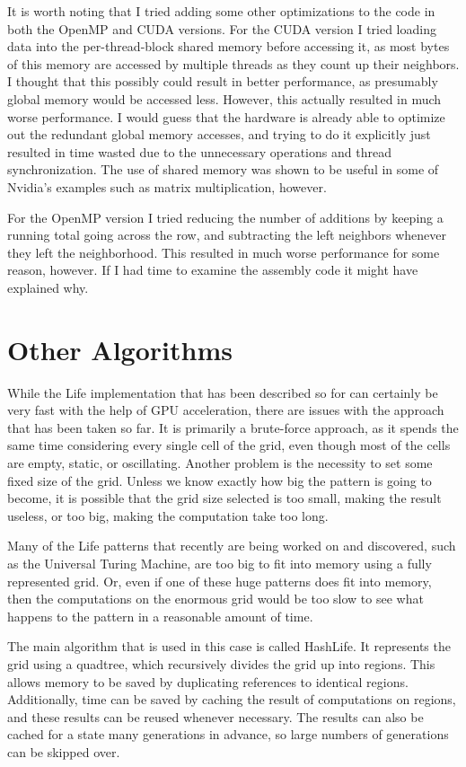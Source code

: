 \documentclass[letterpaper,12pt]{article}
\begin{document}
It is worth noting that I tried adding some other optimizations to the code in
both the OpenMP and CUDA versions.  For the CUDA version I tried loading data
into the per-thread-block shared memory before accessing it, as most bytes of
this memory are accessed by multiple threads as they count up their neighbors.
I thought that this possibly could result in better performance, as presumably
global memory would be accessed less.  However, this actually resulted in much
worse performance.  I would guess that the hardware is already able to optimize
out the redundant global memory accesses, and trying to do it explicitly just
resulted in time wasted due to the unnecessary operations and thread
synchronization.  The use of shared memory was shown to be useful in some of
Nvidia's examples such as matrix multiplication, however.\cite{cuda_prog_guide}

For the OpenMP version I tried reducing the number of additions by keeping a
running total going across the row, and subtracting the left neighbors whenever
they left the neighborhood.  This resulted in much worse performance for some
reason, however.  If I had time to examine the assembly code it might have
explained why.  


\section{Other Algorithms}

While the Life implementation that has been described so for can certainly be
very fast with the help of GPU acceleration, there are issues with the approach
that has been taken so far.  It is primarily a brute-force approach, as it
spends the same time considering every single cell of the grid, even though most
of the cells are empty, static, or oscillating.  Another problem is the necessity
to set some fixed size of the grid.  Unless we know exactly how big the pattern
is going to become, it is possible that the grid size selected is too small,
making the result useless, or too big, making the computation take too long. 

Many of the Life patterns that recently are being worked on and discovered, such
as the Universal Turing Machine, are too big to fit into memory using a fully
represented grid.  Or, even if one of these huge patterns does fit into memory,
then the computations on the enormous grid would be too slow to see what happens
to the pattern in a reasonable amount of time.

The main algorithm that is used in this case is called HashLife.  It represents
the grid using a quadtree, which recursively divides the grid up into regions.
This allows memory to be saved by duplicating references to identical regions.
Additionally, time can be saved by caching the result of computations on
regions, and these results can be reused whenever necessary.  The results can
also be cached for a state many generations in advance, so large numbers of
generations can be skipped over.
\end{document}

